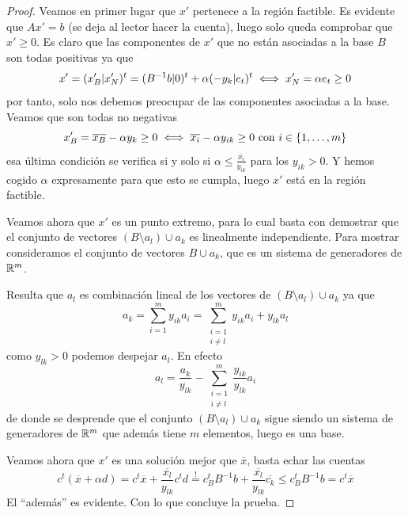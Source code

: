 \begin{proof}
	Veamos en primer lugar que $x'$ pertenece a la región factible. Es evidente que $Ax'=b$ (se deja al lector hacer la cuenta), luego solo queda comprobar que $x'\geq 0$. Es claro que las componentes de $x'$ que no están asociadas a la base $B$ son todas positivas ya que
	\begin{equation*}
		x'=(x_B'|x_N')^t=(B^{-1}b|0)^t+\alpha(-y_k|e_t)^t\iff x_N'=\alpha e_t\geq 0
	\end{equation*}
	por tanto, solo nos debemos preocupar de las componentes asociadas a la base. Veamos que son todas no negativas
	\begin{equation*}
		x_B'=\overline{x_B}-\alpha y_k\geq 0\iff \overline{x_i}-\alpha y_{ik}\geq 0\text{ con } i\in\{1,\dots,m\}
	\end{equation*}
	esa última condición se verifica si y solo si $\alpha\leq \frac{\overline{x_i}}{y_{ik}}$ para los $y_{ik}>0$. Y hemos cogido $\alpha$ expresamente para que esto se cumpla, luego $x'$ está en la región factible.
	
	Veamos ahora que $x'$ es un punto extremo, para lo cual basta con demostrar que el conjunto de vectores $(B\setminus a_l)\cup a_k$ es linealmente independiente. Para mostrar consideramos el conjunto de vectores $B\cup a_k$, que es un sistema de generadores de $\mathbb{R}^m$.
	
	Resulta que $a_l$ es combinación lineal de los vectores de $(B\setminus a_l)\cup a_k$ ya que
	\begin{equation*}
		a_k=\sum_{i=1}^{m}y_{ik}a_i=\sum_{\substack{i=1\\i\not=l}}^{m}y_{ik}a_i+y_{lk}a_l
	\end{equation*}
	como $y_{lk}>0$ podemos despejar $a_l$. En efecto
	\begin{equation*}
		a_l=\frac{a_k}{y_{lk}}-\sum_{\substack{i=1\\i\not=l}}^{m}\frac{y_{ik}}{y_{lk}}a_i
	\end{equation*}
	de donde se desprende que el conjunto $(B\setminus a_l)\cup a_k$ sigue siendo un sistema de generadores de $\mathbb{R}^m$ que además tiene $m$ elementos, luego es una base.
	
	Veamos ahora que $x'$ es una solución mejor que $\overline{x}$, basta echar las cuentas
	\begin{equation*}
		c^t(\overline{x}+\alpha d)=c^t\overline{x}+\frac{\overline{x_l}}{y_{lk}}c^td\stackrel{!}{=}c_B^tB^{-1}b+\frac{\overline{x_l}}{y_{lk}}\overline{c_k}\leq c_B^tB^{-1}b=c^t\overline{x}
	\end{equation*}
	El ``además'' es evidente. Con lo que concluye la prueba.
\end{proof}
